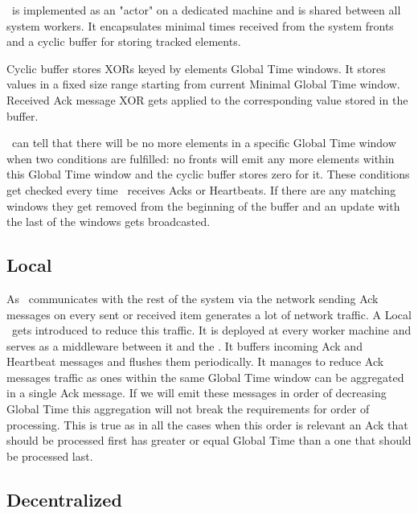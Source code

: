\tracker\ is implemented as an "actor" on a dedicated machine and is shared between all system workers. It encapsulates minimal times received from the system fronts and a cyclic buffer for storing tracked elements.

Cyclic buffer stores XORs keyed by elements Global Time windows. It stores values in a fixed size range starting from current Minimal Global Time window. Received Ack message XOR gets applied to the corresponding value stored in the buffer.

\tracker\ can tell that there will be no more elements in a specific Global Time window when two conditions are fulfilled: no fronts will emit any more elements within this Global Time window and the cyclic buffer stores zero for it. These conditions get checked every time \tracker\ receives Acks or Heartbeats. If there are any matching windows they get removed from the beginning of the buffer and an update with the last of the windows gets broadcasted.

\subsection{Local \tracker\ }

As \tracker\ communicates with the rest of the system via the network sending Ack messages on every sent or received item generates a lot of network traffic. A Local \tracker\ gets introduced to reduce this traffic. It is deployed at every worker machine and serves as a middleware between it and the \tracker. It buffers incoming Ack and Heartbeat messages and flushes them periodically. It manages to reduce Ack messages traffic as ones within the same Global Time window can be aggregated in a single Ack message. If we will emit these messages in order of decreasing Global Time this aggregation will not break the requirements for order of processing. This is true as in all the cases when this order is relevant an Ack that should be processed first has greater or equal Global Time than a one that should be processed last. 

\subsection{Decentralized \tracker\ }


